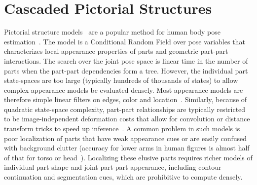 \chapter{Cascaded Pictorial Structures}\label{sec:CPS}

Pictorial structure models~\cite{fischler1973ps} are a popular method for human body pose estimation~\cite{felz05,fergus2005sparse,devacrf,ferrari08,andriluka09}.
The model is a Conditional Random Field over pose variables that characterizes 
local appearance properties of parts and geometric part-part interactions.   
The search over the joint pose space is linear time in the number of parts when 
the part-part dependencies form a tree.  However,  the individual part 
state-spaces are too large (typically hundreds of thousands of states) to allow 
complex appearance models be evaluated densely.   Most appearance models are 
therefore simple linear filters on edges, color and 
location~\cite{felz05,devacrf,ferrari08,andriluka09}. Similarly, because of 
quadratic state-space complexity, part-part relationships are typically 
restricted to be image-independent deformation costs that allow for convolution 
or distance transform tricks to speed up inference~\cite{felz05}. A common 
problem in such models is poor localization of parts that have weak appearance 
cues or are easily confused with background clutter (accuracy for lower arms in 
human figures is almost half of that for torso or head~\cite{andriluka09}).   
Localizing these elusive parts requires richer models of individual part shape 
and joint part-part appearance, including contour continuation and segmentation 
cues, which are prohibitive to compute densely.

